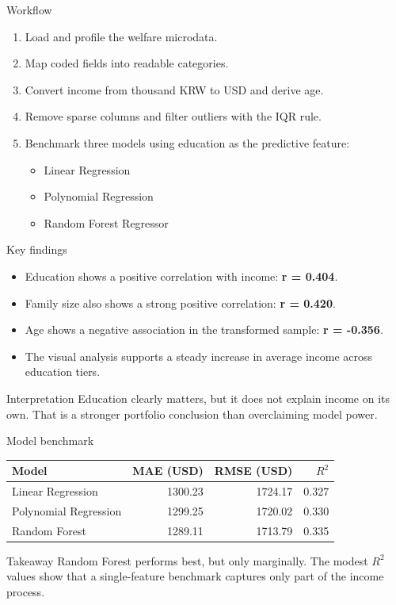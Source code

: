 \documentclass[aspectratio=169]{beamer}
\begin{document}
\begin{frame}{Workflow}
  \begin{enumerate}
    \item Load and profile the welfare microdata.
    \item Map coded fields into readable categories.
    \item Convert income from thousand KRW to USD and derive age.
    \item Remove sparse columns and filter outliers with the IQR rule.
    \item Benchmark three models using education as the predictive feature:
    \begin{itemize}
      \item Linear Regression
      \item Polynomial Regression
      \item Random Forest Regressor
    \end{itemize}
  \end{enumerate}
\end{frame}

\begin{frame}{Key findings}
  \begin{itemize}
    \item Education shows a positive correlation with income: \textbf{r = 0.404}.
    \item Family size also shows a strong positive correlation: \textbf{r = 0.420}.
    \item Age shows a negative association in the transformed sample: \textbf{r = -0.356}.
    \item The visual analysis supports a steady increase in average income across education tiers.
  \end{itemize}

  \begin{block}{Interpretation}
    Education clearly matters, but it does not explain income on its own. That is a stronger portfolio conclusion than overclaiming model power.
  \end{block}
\end{frame}

\begin{frame}{Model benchmark}
  \small
  \begin{tabular}{lrrr}
    \toprule
    Model & MAE (USD) & RMSE (USD) & $R^2$ \\
    \midrule
    Linear Regression & 1300.23 & 1724.17 & 0.327 \\
    Polynomial Regression & 1299.25 & 1720.02 & 0.330 \\
    Random Forest & 1289.11 & 1713.79 & 0.335 \\
    \bottomrule
  \end{tabular}

  \vspace{0.7cm}

  \begin{block}{Takeaway}
    Random Forest performs best, but only marginally. The modest $R^2$ values show that a single-feature benchmark captures only part of the income process.
  \end{block}
\end{frame}
\end{document}
